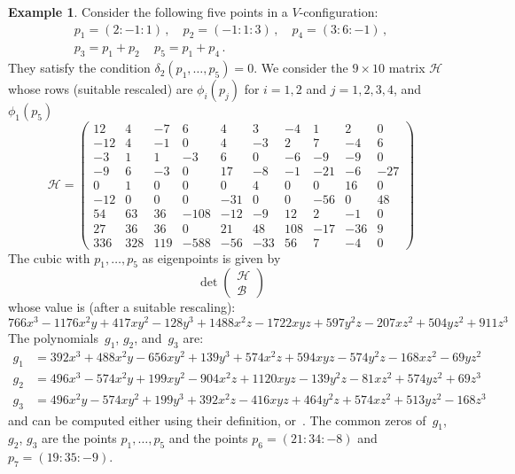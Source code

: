\documentclass[a4paper, 11pt, reqno]{amsart}
\theoremstyle{plain}
\theoremstyle{definition}
\newtheorem{es}[lemma]{Example}
\begin{document}
\begin{es}
Consider the following five points in a $V$-configuration:
%
\begin{gather*}
  p_1 = (2: -1: 1) \,, \quad p_2 = (-1: 1: 3) \,, \quad p_4 = (3: 6: -1) \,, \\
  p_3 = p_1+p_2 \, \quad p_5 = p_1+p_4 \,.
\end{gather*}
%
They satisfy the condition $\delta_2(p_1, \dots, p_5) = 0$.
We consider the $9\times 10$ matrix $\mathcal{H}$ whose rows
(suitable rescaled) are $\phi_i(p_j)$ for $i = 1, 2$ and $j = 1, 2, 3, 4$, and $\phi_1(p_5)$
%
\[
  \mathcal{H} =
  \left(
  \begin{array}{rrrrrrrrrr}
    12 & 4 & -7 & 6 & 4 & 3 & -4 & 1 & 2 & 0 \\
    -12 & 4 & -1 & 0 & 4 & -3 & 2 & 7 & -4 & 6 \\
    -3 & 1 & 1 & -3 & 6 & 0 & -6 & -9 & -9 & 0 \\
    -9 & 6 & -3 & 0 & 17 & -8 & -1 & -21 & -6 & -27 \\
    0 & 1 & 0 & 0 & 0 & 4 & 0 & 0 & 16 & 0 \\
    -12 & 0 & 0 & 0 & -31 & 0 & 0 & -56 & 0 & 48 \\
    54 & 63 & 36 & -108 & -12 & -9 & 12 & 2 & -1 & 0\\
    27 & 36 & 36 & 0 & 21 & 48 & 108 & -17 & -36 & 9 \\
    336 & 328 & 119 & -588 & -56 & -33 & 56 & 7 & -4 & 0
  \end{array}
  \right)
\]
%
The cubic with $p_1, \dots, p_5$ as eigenpoints is given by
%
\[
  \det \left(
  \begin{array}{c}
    \mathcal{H}\\
    \mathcal{B}
  \end{array}
  \right)
\]
%
whose value is (after a suitable rescaling):
%
\[
  766x^3 - 1176x^2y + 417xy^2 - 128y^3 + 1488x^2z - 1722xyz
  + 597y^2z - 207xz^2 + 504yz^2 + 911z^3
\]
%
The polynomials~$g_1$, $g_2$, and~$g_3$ are:
%
\begin{align*}
  g_1 &= 392x^3 + 488x^2y - 656xy^2 + 139y^3 + 574x^2z + 594xyz - 574y^2z - 168xz^2 - 69yz^2 \\
  g_2 &= 496x^3 - 574x^2y + 199xy^2 - 904x^2z + 1120xyz - 139y^2z - 81xz^2 + 574yz^2 + 69z^3 \\
  g_3 &= 496x^2y - 574xy^2 + 199y^3 + 392x^2z - 416xyz + 464y^2z + 574xz^2 + 513yz^2 - 168z^3
\end{align*}
%
and can be computed either using their definition,
or~.
The common zeros of~$g_1$, $g_2$, $g_3$ are the points $p_1, \dots, p_5$
and the points $p_6 = (21: 34: -8)$ and $p_7 = (19: 35: -9)$.
\end{es}
\end{document}
